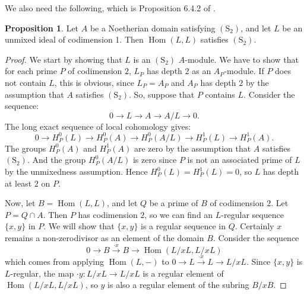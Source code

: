 \documentclass{amsart}
\theoremstyle{definition}
\newtheorem{proposition}[theorem]{Proposition}
\DeclareMathOperator{\Hom}{Hom}
\newcommand{\ra}{\rightarrow}
\newcommand{\Stwo}{(\text{S}_2)}
\begin{document}
We also need the following, which is Proposition 6.4.2 of \cite{Va}.
\begin{proposition}\label{prop:s2}
Let $A$ be a Noetherian domain satisfying $\Stwo$, and let $L$ be an unmixed ideal of codimension 1.  Then $\Hom(L,L)$ satisfies $\Stwo$.
\end{proposition}
\begin{proof}
We start by showing that $L$ is an $\Stwo$ $A$-module.  We have to show that for each prime $P$ of codimension $2$, $L_P$ has depth $2$ as an $A_P$-module.  If $P$ does not contain $L$, this is obvious, since $L_P = A_P$ and $A_P$ has depth $2$ by the assumption that $A$ satisfies $\Stwo$.  So, suppose that $P$ contains $L$.  Consider the sequence:
$$ 0 \ra L \ra A \ra A/L \ra 0.$$
The long exact sequence of local cohomology gives:
$$ 0 \ra H^0_P(L) \ra H^0_P(A) \ra H^0_P(A/L) \ra H^1_P(L) \ra H^1_P(A).$$
The groups $H^0_P(A)$ and $H^1_P(A)$ are zero by the assumption that $A$ satisfies $\Stwo$.  And the group $H^0_P(A/L)$ is zero since $P$ is not an associated prime of $L$ by the unmixedness assumption.  Hence $H^0_P(L) = H^1_P(L) = 0$, so $L$ has depth at least $2$ on $P$.

Now, let $B = \Hom(L,L)$, and let $Q$ be a prime of $B$ of codimension $2$.  Let $P = Q\cap A$.  Then $P$ has codimension $2$, so we can find an $L$-regular sequence $\{x,y\}$ in $P$.  We will show that $\{x,y\}$ is a regular sequence in $Q$.  Certainly $x$ remains a non-zerodivisor as an element of the domain $B$.  Consider the sequence
$$0 \ra B \xrightarrow{\cdot x} B \ra \Hom(L/xL, L/xL)$$
which comes from applying $\Hom(L, -)$ to $0 \ra L \xrightarrow{\cdot x} L \ra L/xL$.  Since $\{x,y\}$ is $L$-regular, the map $\cdot y: L/xL \ra L/xL$ is a regular element of $\Hom(L/xL, L/xL)$, so $y$ is also a regular element of the subring $B/xB$.
\end{proof}
\end{document}
